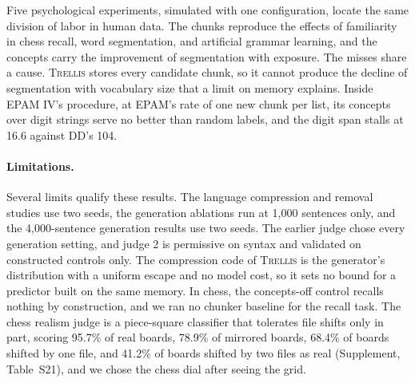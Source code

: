 \documentclass[11pt,letterpaper]{article}
\newcommand{\trellis}{\textsc{Trellis}}
\begin{document}
Five psychological experiments, simulated with one configuration, locate the same
division of labor in human data. The chunks reproduce the effects of familiarity in
chess recall, word segmentation, and artificial grammar learning, and the concepts
carry the improvement of segmentation with exposure. The misses share a cause.
\trellis{} stores every candidate chunk, so it cannot produce the decline of
segmentation with vocabulary size that a limit on memory explains. Inside EPAM IV's
procedure, at EPAM's rate of one new chunk per list, its concepts over digit strings
serve no better than random labels, and the digit span stalls at 16.6 against DD's 104.

\paragraph{Limitations.} Several limits qualify these results. The language compression
and removal studies use two seeds, the generation ablations run at 1,000 sentences
only, and the 4,000-sentence generation results use two seeds. The earlier judge chose
every generation setting, and judge 2 is permissive on syntax and validated on
constructed controls only. The compression code of \trellis{} is the generator's
distribution with a uniform escape and no model cost, so it sets no bound for a
predictor built on the same memory. In chess, the concepts-off control recalls nothing
by construction, and we ran no chunker baseline for the recall task. The chess realism
judge is a piece-square classifier that tolerates file shifts only in part, scoring
95.7\% of real boards, 78.9\% of mirrored boards, 68.4\% of boards shifted by one file,
and 41.2\% of boards shifted by two files as real (Supplement, Table~S21), and we chose
the chess dial after seeing the grid.
\end{document}

